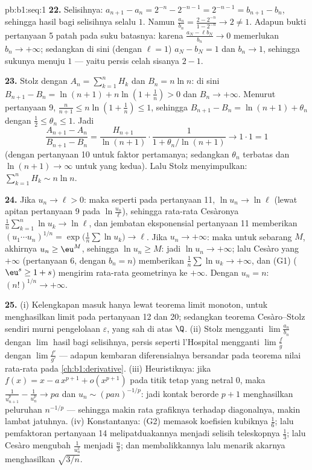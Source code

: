 \begin{solution}{pb:b1:seq:1}
\textbf{22.} Selisihnya: $a_{n+1} - a_n = 2^{-n} - 2^{-n-1} =
2^{-n-1} = b_{n+1} - b_n$, sehingga hasil bagi selisihnya
selalu $1$. Namun $\frac{a_n}{b_n} = \frac{2 - 2^{-n}}{1 -
2^{-n}} \to 2 \neq 1$. Adapun bukti pertanyaan 5 patah pada
suku batasnya: karena $\frac{a_N - \ell b_N}{b_n} \to 0$ memerlukan $b_n
\to +\infty$; sedangkan di sini (dengan $\ell = 1$) $a_N - b_N = 1$ dan $b_n
\to 1$, sehingga sukunya menuju $1$ --- yaitu persis celah sisanya
$2 - 1$.

\textbf{23.} Stolz dengan $A_n = \sum_{k=1}^n H_k$ dan $B_n = n\ln
n$: di sini $B_{n+1} - B_n = \ln(n+1) + n\ln(1 + \frac1n) > 0$ dan $B_n
\to +\infty$. Menurut pertanyaan 9, $\frac{n}{n+1} \leq n\ln(1 +
\frac1n) \leq 1$, sehingga $B_{n+1} - B_n = \ln(n+1) + \theta_n$ dengan
$\frac12 \leq \theta_n \leq 1$. Jadi
\[
\frac{A_{n+1} - A_n}{B_{n+1} - B_n}
= \frac{H_{n+1}}{\ln(n+1)}\cdot
\frac{1}{1 + \theta_n/\ln(n+1)} \longrightarrow 1 \cdot 1 = 1
\]
(dengan pertanyaan 10 untuk faktor pertamanya; sedangkan $\theta_n$ terbatas dan
$\ln(n+1) \to \infty$ untuk yang kedua). Lalu Stolz menyimpulkan:
$\sum_{k=1}^n H_k \sim n\ln n$.

\textbf{24.} Jika $u_n \to \ell > 0$: maka seperti pada pertanyaan 11, $\ln u_n
\to \ln\ell$ (lewat apitan pertanyaan 9 pada $\ln\frac{u_n}{\ell}$), sehingga
rata-rata Cesàronya $\frac1n\sum_{k=1}^n \ln u_k \to \ln\ell$,
dan jembatan eksponensial pertanyaan 11 memberikan $(u_1\cdots
u_n)^{1/n} = \exp\bigl(\frac1n\sum\ln u_k\bigr) \to \ell$. Jika
$u_n \to +\infty$: maka untuk sebarang $M$, akhirnya $u_n \geq \eu^M$, sehingga
$\ln u_n \geq M$: jadi $\ln u_n \to +\infty$; lalu Cesàro yang $+\infty$
(pertanyaan 6, dengan $b_n = n$) memberikan $\frac1n\sum \ln u_k \to
+\infty$, dan (G1) ($\eu^s \geq 1 + s$) mengirim rata-rata geometrinya
ke $+\infty$. Dengan $u_n = n$: $(n!)^{1/n} \to +\infty$.

\textbf{25.} (i) Kelengkapan masuk hanya lewat teorema limit
monoton, untuk menghasilkan limit pada pertanyaan 12 dan 20;
sedangkan teorema Cesàro--Stolz sendiri murni
pengelolaan $\varepsilon$, yang sah di atas $\Q$. (ii) Stolz mengganti
$\lim \frac{a_n}{b_n}$ dengan $\lim$ hasil bagi selisihnya,
persis seperti l'Hospital mengganti $\lim\frac fg$ dengan
$\lim\frac{f'}{g'}$ --- adapun kembaran diferensialnya bersandar pada teorema
nilai rata-rata pada \cref{ch:b1:derivative}. (iii) Heuristiknya: jika
$f(x) = x - a\,x^{p+1} + o(x^{p+1})$ pada titik tetap yang netral
$0$, maka $\frac{1}{u_{n+1}^p} - \frac{1}{u_n^p} \to pa$ dan
$u_n \sim (pan)^{-1/p}$: jadi kontak berorde $p + 1$ menghasilkan peluruhan
$n^{-1/p}$ --- sehingga makin rata grafiknya terhadap diagonalnya, makin
lambat jatuhnya. (iv) Konstantanya: (G2) memasok koefisien
kubiknya $\frac16$; lalu pemfaktoran pertanyaan 14 melipatduakannya
menjadi selisih teleskopnya $\frac13$; lalu Cesàro mengubah
$\frac{1}{u_n^2}$ menjadi $\frac n3$; dan membalikkannya lalu menarik akarnya
menghasilkan $\sqrt{3/n}$.

\end{solution}
